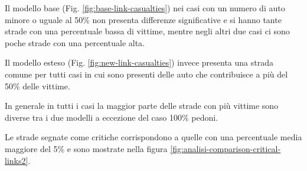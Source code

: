 Il modello base (Fig. \ref{fig:base-link-casualties}) nei casi con un numero di auto minore o uguale al 50\%
non presenta differenze significative e si hanno tante strade con una percentuale bassa di vittime, 
mentre negli altri due casi ci sono poche strade con una percentuale alta.

Il modello esteso (Fig. \ref{fig:new-link-casualties}) invece presenta una strada comune per tutti casi 
in cui sono presenti delle auto che contribuisce a più del 50\% delle vittime.

In generale in tutti i casi la maggior parte delle strade con più vittime sono diverse tra i due modelli a eccezione del caso 
100\% pedoni.

Le strade segnate come critiche corrispondono a quelle con una percentuale media maggiore del 5\% e sono mostrate nella figura \ref{fig:analisi-comparison-critical-links2}.

